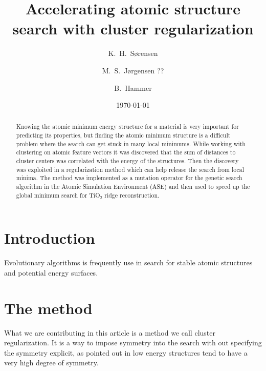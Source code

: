 \documentclass[%
 aps,
 prl,%
 amsmath,amssymb,
 reprint,%
]{revtex4-1}
\begin{document}
\title[]{Accelerating atomic structure search with cluster regularization}%

\author{K.\ H.\ S{\o}rensen}
\author{M.\ S.\ J{\o}rgensen ??}
\author{B.\ Hammer}
 
\date{\today}%

\begin{abstract}
Knowing the atomic minimum energy structure for a material is very important for predicting 
its properties, but finding the atomic minimum structure is a difficult problem where the search can get stuck in many local minimums. 
While working with clustering on atomic feature vectors it was discovered that the sum of distances to cluster centers 
was correlated with the energy of the structures. Then the discovery was exploited in a regularization method which can help release the search from local minima.
The method was implemented as a mutation operator for the genetic search algorithm in the Atomic Simulation Environment (ASE) and then used to speed up the global minimum search for TiO$_{2}$ ridge reconstruction. 
\end{abstract}

\keywords{}%
\maketitle

\section{\label{sec:introduction}Introduction}
Evolutionary algorithms is frequently use in search for stable atomic structures and potential energy surfaces.

\section{The method}
What we are contributing in this article is a method we call cluster regularization. 
It is a way to impose symmetry into the search with out specifying the symmetry explicit, 
as pointed out in \cite{Pikard2011} low energy structures tend to have a very high degree of symmetry.
\end{document}
